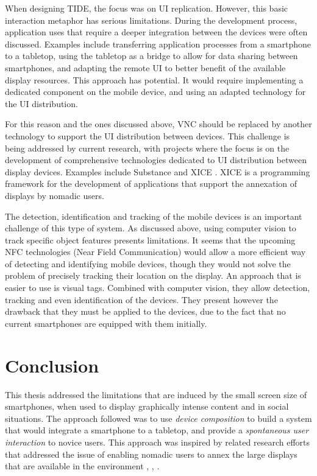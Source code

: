 When designing TIDE, the focus was on UI replication.
However, this basic interaction metaphor has serious limitations.
During the development process, application uses that require a deeper integration between the devices were often discussed.
Examples include transferring application processes from a smartphone to a tabletop, using the tabletop as a bridge to allow for data sharing between smartphones, and adapting the remote UI to better benefit of the available display resources.
This approach has potential.
It would require implementing a dedicated component on the mobile device, and using an adapted technology for the UI distribution.

For this reason and the ones discussed above, VNC should be replaced by another technology to support the UI distribution between devices.
This challenge is being addressed by current research, with projects where the focus is on the development of comprehensive technologies dedicated to UI distribution between display devices.
Examples include Substance \citep{Gjerlufsen:2011:substance} and XICE \citep{Arthur:2011:xice}.
XICE is a programming framework for the development of applications that support the annexation of displays by nomadic users.

The detection, identification and tracking of the mobile devices is an important challenge of this type of system.
As discussed above, using computer vision to track specific object features presents limitations.
It seems that the upcoming NFC technologies (Near Field Communication) would allow a more efficient way of detecting and identifying mobile devices, though they would not solve the problem of precisely tracking their location on the display.
An approach that is easier to use is visual tags.
Combined with computer vision, they allow detection, tracking and even identification of the devices.
They present however the drawback that they must be applied to the devices, due to the fact that no current smartphones are equipped with them initially.

\chapter{Conclusion}
\label{conclusion}

This thesis addressed the limitations that are induced by the small screen size of smartphones, when used to display graphically intense content and in social situations.
The approach followed was to use \emph{device composition} to build a system that would integrate a smartphone to a tabletop, and provide a \emph{spontaneous user interaction} to novice users.
This approach was inspired by related research efforts that addressed the issue of enabling nomadic users to annex the large displays that are available in the environment \citep{Want:2002:personalserver}, \citep{Arthur:2011:xice}, \citep{Baur:2012:virtualprojection}.

